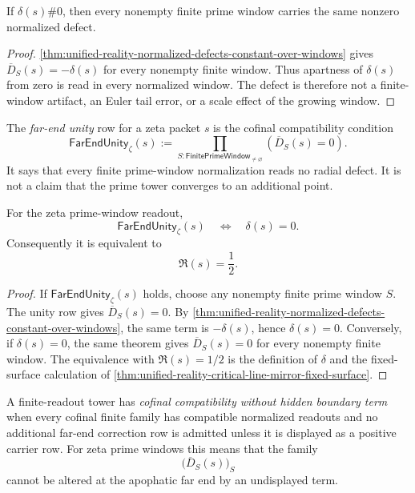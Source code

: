 \begin{corollary}
\label{cor:unified-reality-off-half-displacement-cofinally-visible}
If $\delta(s)\#0$, then every nonempty finite prime window carries the
same nonzero normalized defect.
\end{corollary}

\begin{proof}
\autoref{thm:unified-reality-normalized-defects-constant-over-windows}
gives $\overline D_S(s)=-\delta(s)$ for every nonempty finite window.
Thus apartness of $\delta(s)$ from zero is read in every normalized
window.  The defect is therefore not a finite-window artifact, an Euler
tail error, or a scale effect of the growing window.
\end{proof}

\begin{definition}
\label{def:unified-reality-far-end-unity-zeta-prime-windows}
The \emph{far-end unity} row for a zeta packet $s$ is the cofinal
compatibility condition
$$
\mathsf{FarEndUnity}_{\zeta}(s)
:=
\prod_{S:\mathsf{FinitePrimeWindow}_{\ne\varnothing}}
\left(
\overline D_S(s)=0
\right).
$$
It says that every finite prime-window normalization reads no radial
defect.  It is not a claim that the prime tower converges to an
additional point.
\end{definition}

\begin{theorem}
\label{thm:unified-reality-far-end-unity-fixed-half-surface}
For the zeta prime-window readout,
$$
\mathsf{FarEndUnity}_{\zeta}(s)
\quad\Longleftrightarrow\quad
\delta(s)=0.
$$
Consequently it is equivalent to
$$
\Re(s)=\frac12.
$$
\end{theorem}

\begin{proof}
If $\mathsf{FarEndUnity}_{\zeta}(s)$ holds, choose any nonempty finite
prime window $S$.  The unity row gives $\overline D_S(s)=0$.  By
\autoref{thm:unified-reality-normalized-defects-constant-over-windows},
the same term is $-\delta(s)$, hence $\delta(s)=0$.  Conversely, if
$\delta(s)=0$, the same theorem gives $\overline D_S(s)=0$ for every
nonempty finite window.  The equivalence with $\Re(s)=1/2$ is the
definition of $\delta$ and the fixed-surface calculation of
\autoref{thm:unified-reality-critical-line-mirror-fixed-surface}.
\end{proof}

\begin{definition}
\label{def:unified-reality-cofinal-compatibility-no-hidden-boundary}
A finite-readout tower has \emph{cofinal compatibility without hidden
boundary term} when every cofinal finite family has compatible normalized
readouts and no additional far-end correction row is admitted unless it
is displayed as a positive carrier row.  For zeta prime windows this
means that the family
$$
\bigl(\overline D_S(s)\bigr)_S
$$
cannot be altered at the apophatic far end by an undisplayed term.
\end{definition}

